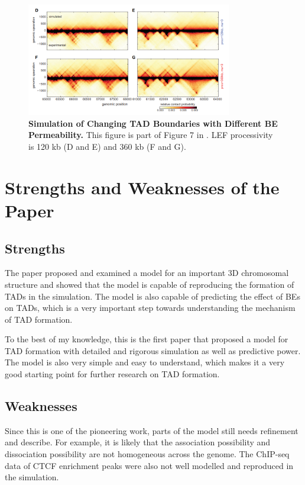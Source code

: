 \documentclass[11pt]{article}
\begin{document}
\begin{figure}[htbp]
  \centering
  \includegraphics[width=0.8\textwidth]{assets/Snipaste_2023-01-13_19-45-50.png}
  \caption{\textbf{Simulation of Changing TAD Boundaries with Different BE Permeability. } This figure is part of Figure 7 in \cite{fudenberg_formation_2016}. LEF processivity is 120 kb (D and E) and 360 kb (F and G).}
  \label{fig:Simulation of Changing TAD Boundaries with Different BE Permeability}
\end{figure}

\section{Strengths and Weaknesses of the Paper}

\subsection*{Strengths}

The paper proposed and examined a model for an important 3D chromosomal structure and showed that the model is capable of reproducing the formation of TADs in the simulation. The model is also capable of predicting the effect of BEs on TADs, which is a very important step towards understanding the mechanism of TAD formation.

To the best of my knowledge, this is the first paper that proposed a model for TAD formation with detailed and rigorous simulation as well as predictive power. The model is also very simple and easy to understand, which makes it a very good starting point for further research on TAD formation.

\subsection*{Weaknesses}

Since this is one of the pioneering work, parts of the model still needs refinement and describe. For example, it is likely that the association possibility and dissociation possibility are not homogeneous across the genome. The ChIP-seq data of CTCF enrichment peaks were also not well modelled and reproduced in the simulation.
\end{document}
